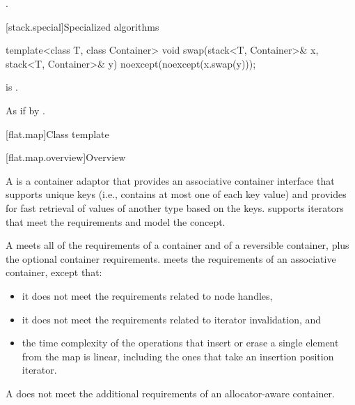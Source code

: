 \begin{itemdescr}
\pnum
\returns
{}.
\end{itemdescr}

[stack.special]{Specialized algorithms}

%
\begin{itemdecl}
template<class T, class Container>
  void swap(stack<T, Container>& x, stack<T, Container>& y) noexcept(noexcept(x.swap(y)));
\end{itemdecl}

\begin{itemdescr}
\pnum
\constraints
{} is .

\pnum
\effects
As if by .
\end{itemdescr}

[flat.map]{Class template }

[flat.map.overview]{Overview}

\pnum
{}%
A  is a container adaptor
that provides an associative container interface
that supports unique keys
(i.e., contains at most one of each key value) and
provides for fast retrieval of values of another type 
based on the keys.
 supports iterators
that meet the  requirements and
model the
 concept.

\pnum
A  meets all of the requirements
of a container and
of a reversible container,
plus the optional container requirements.
 meets the requirements of
an associative container,
except that:
\begin{itemize}
\item
it does not meet the requirements related to node handles,
\item
it does not meet the requirements related to iterator invalidation, and
\item
the time complexity of the operations that insert or erase a single
element from the map is linear, including the ones that take an insertion
position iterator.
\end{itemize}
\begin{note}
A  does not meet the additional requirements of
an allocator-aware container.
\end{note}

